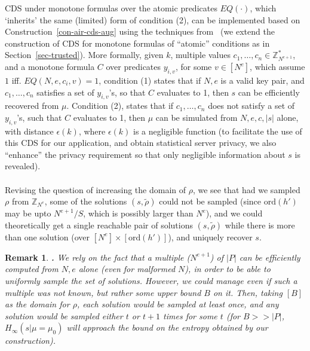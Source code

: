 \documentclass{article}
\newcommand{\order}{{\mathrm{ord}}}
\newcommand{\size}[1]{|#1|}
\newcommand{\Z}{{\mathbb{Z}}}
\newtheorem{REMARK}{Remark}[section]
\newenvironment{remark}{\begin{REMARK} \hspace{-.85em} {\bf .} \rm}%
	{\end{REMARK}}
\newcommand{\opbrange}[3][,]{#2#1\ldots#1#3}
\newcommand{\U}[1]{\mathbb{Z}_{#1}^*}
\newcommand{\eps}{{\epsilon}}
\begin{document}
CDS under monotone formulas over the atomic predicates $EQ(\cdot)$, which `inherits' the same (limited) form of condition (2), can be implemented based on Construction~\ref{con-air-cds-aug} using the techniques from~\cite{AIR01,GIKM} (we extend the construction of CDS for monotone formulas of ``atomic'' 
conditions as in Section~\ref{sec-trusted}).
More formally, given $k$, multiple values $\opbrange{c_1}{c_n}\in\U{N^{e+1}}$, and a monotone formula $C$ over predicates $y_{i,v}$, for some $v\in[N^e]$, which assume $1$ iff. $EQ(N,e,c_i,v)=1$, condition (1) states that if $N,e$ is a valid key pair, and $\opbrange{c_1}{c_n}$ satisfies a set of $y_{i,v}$'s, so that $C$ evaluates to 1, then $s$ can be efficiently recovered from $\mu$. Condition (2), states that if $\opbrange{c_1}{c_n}$ does not satisfy a set of $y_{i,v}$'s, such that $C$ evaluates to 1, then $\mu$ can be simulated from $N,e,c,\size{s}$ alone, with distance $\eps(k)$, where $\eps(k)$ is a negligible function (to facilitate the use of this CDS
for our application, and obtain statistical server privacy, we also ``enhance'' the privacy requirement so that only negligible information about $s$ is revealed).
\paragraph{}Revising the question of increasing the domain of $\rho$, we see that had we sampled $\rho$ from $\Z_{N^e}$, some of the solutions $(s,\tilde{\rho})$ could not be sampled (since $\order(h')$ may be upto $N^{e+1}/S$, which is possibly larger than $N^e$), and we could theoretically get a single reachable pair of solutions $(s,\tilde{\rho})$ while there is more than one solution (over $[N^e]\times[\order(h')]$), and uniquely recover $s$.
\begin{remark}%
  We rely on the fact that a multiple ($N^{e+1}$) of $\size{P}$ can be efficiently
  computed from $N,e$ alone (even for malformed $N$), in order to be able to uniformly sample the set
  of solutions. However, we could manage even if such a multiple was not known, but rather some upper bound
  $B$ on it. Then, taking $[B]$ as the domain for $\rho$, each solution would be sampled at least once,
  and any solution would be sampled either $t$ or $t+1$ times for some $t$ (for $B>>\size{P}$, $H_{\infty}(s|\mu=\mu_0)$ will approach the bound on the entropy obtained by our construction).
\end{remark}
\end{document}
